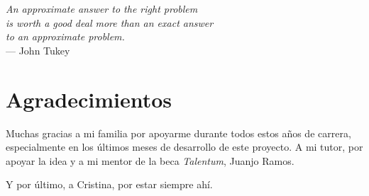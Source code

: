 

\begin{flushright}{\slshape
    An approximate answer to the right problem \\
    is worth a good deal more than an exact answer\\
    to an approximate problem.} \\ \medskip
    --- John Tukey
\end{flushright}


\bigskip

\begingroup
\let\clearpage\relax
\let\cleardoublepage\relax
\let\cleardoublepage\relax
\chapter*{Agradecimientos}

Muchas gracias a mi familia por apoyarme durante todos estos años de carrera,
especialmente en los últimos meses de desarrollo de este proyecto. A mi tutor,
por apoyar la idea y a mi mentor de la beca \emph{Talentum}, Juanjo Ramos.

\bigskip

Y por último, a Cristina, por estar siempre ahí.

\endgroup



